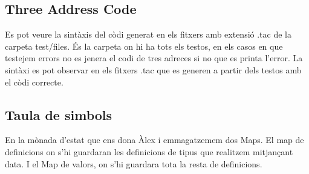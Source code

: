 \documentclass{article}
\begin{document}
\subsection{Three Address Code}
Es pot veure la sintàxis del còdi generat en els fitxers amb extensió
.tac de la carpeta test/files. És la carpeta on hi ha tots els testos,
en els casos en que testejem errors no es jenera el codi de tres adreces
si no que es printa l'error. La sintàxi es pot observar en els fitxers
.tac que es generen a partir dels testos amb el còdi correcte.
\subsection{Taula de simbols}
En la mònada d'estat que ens dona Àlex i emmagatzemem dos Maps. El map
de definicions on s'hi guardaran les definicions de tipus que realitzem
mitjançant data. I el Map de valors, on s'hi guardara tota la resta de
definicions.
\end{document}
